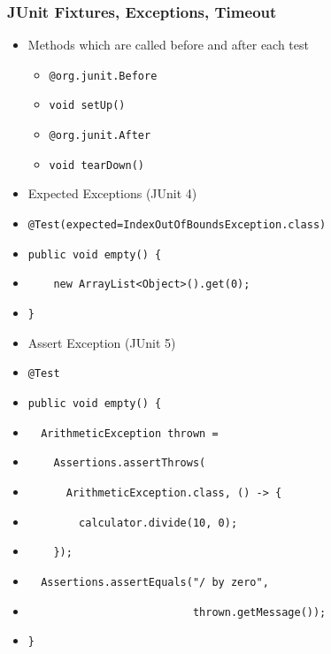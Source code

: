 \documentclass[10pt,xcolor=pdflatex]{beamer}
\begin{document}
\begin{frame}[containsverbatim]\frametitle{JUnit Fixtures, Exceptions, Timeout}
\begin{itemize}
    \item Methods which are called before and after each test
      \begin{itemize}
        \item \texttt{@org.junit.Before}
	    \item[] \texttt{void setUp()}
	    \item \texttt{@org.junit.After}
	    \item[] \texttt{void tearDown()}
      \end{itemize}
    \item Expected Exceptions (JUnit 4)	
    \item[] \verb+@Test(expected=IndexOutOfBoundsException.class)+
	\item[] \verb+public void empty() {+
	\item[] \verb+    new ArrayList<Object>().get(0);+
	\item[] \verb+}+
	\item Assert Exception (JUnit 5)
	\item[] \verb+@Test+
    \item[] \verb+public void empty() {+
    \item[] \verb+  ArithmeticException thrown = +
    \item[] \verb+    Assertions.assertThrows(+
    \item[] \verb+      ArithmeticException.class, () -> {+
    \item[] \verb+        calculator.divide(10, 0);+
    \item[] \verb+    });+
    \item[] \verb+  Assertions.assertEquals("/ by zero", +
    \item[] \verb+                          thrown.getMessage());+
    \item[] \verb+}+
\end{itemize}
\end{frame}
\end{document}
